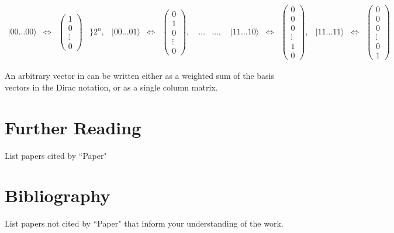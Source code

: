 \documentclass[12pt]{article}
\begin{document}
\begin{equation}
    \begin{array}{ccccccc}
    |00\ldots00\rangle & \Longleftrightarrow &
    \begin{pmatrix} 
    1 \\ 
    0 \\ 
    \vdots \\ 
    0
    \end{pmatrix} & \Bigg\} 2^n, &
    |00\ldots01\rangle & \Longleftrightarrow &
    \begin{pmatrix} 
    0 \\ 
    1 \\ 
    0 \\ 
    \vdots \\ 
    0
    \end{pmatrix}, \quad \ldots
    \end{array}

    \begin{array}{ccccccc}
    \ldots, \quad |11\ldots10\rangle & \Longleftrightarrow &
    \begin{pmatrix} 
    0 \\ 
    0 \\ 
    0 \\ 
    \vdots \\ 
    1 \\ 
    0
    \end{pmatrix}, &
    |11\ldots11\rangle & \Longleftrightarrow &
    \begin{pmatrix} 
    0 \\ 
    0 \\ 
    0 \\ 
    \vdots \\ 
    0 \\ 
    1
    \end{pmatrix}
    \end{array}
\end{equation}

An arbitrary vector in can be written either as a weighted sum of the basis vectors in the Dirac notation, or as a single column matrix.

\clearpage

\section{Further Reading}
List papers cited by ``Paper"

\section{Bibliography}
List papers not cited by ``Paper" that inform your understanding of the work.
\end{document}
